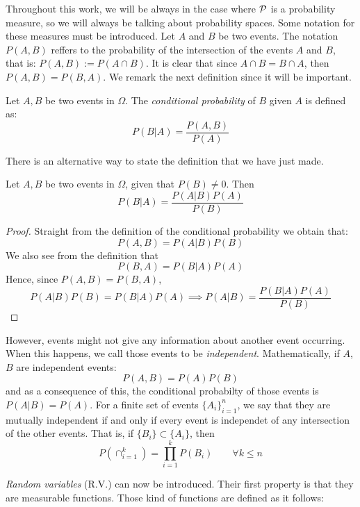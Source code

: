 Throughout this work, we will be always in the case where $\mathcal{P}$ is a probability measure, so we will always be talking about probability spaces. Some notation for these measures must be introduced. Let $A$ and $B$ be two events.
The notation $P(A,B)$ reffers to the probability of the intersection of the events $A$ and $B$, that is: $P(A,B) := P(A\cap B)$.
 It is clear that since $A \cap B = B \cap A$, then $P(A,B) = P(B,A)$. We remark the next definition since it will be important.

\begin{ndef}
Let $A,B$ be two events in $\Omega$. The \emph{conditional probability} of $B$ given $A$ is defined as:
$$
P(B|A) = \frac{P(A,B)}{P(A)}
$$
\end{ndef}




There is an alternative way to state the definition that we have just made.

\begin{nth}
Let $A,B$ be two events in $\Omega$, given that $P(B) \neq 0$. Then
$$
P(B|A) = \frac{P(A|B) P(A)}{P(B)}
$$
\end{nth}
\begin{proof}
Straight from the definition of the conditional probability we obtain that:
$$
P(A,B) = P(A|B)P(B)
$$
We also see from the definition that
$$
P(B,A) = P(B|A)P(A)
$$
Hence, since $P(A,B) = P(B,A)$,
$$
P(A|B)P(B) = P(B|A)P(A) \implies P(A|B) = \frac{P(B|A)P(A)}{P(B)}
$$
\end{proof}


However, events might not give any information about another event occurring. When this happens, we call those events to be \emph{independent}. Mathematically, if $A$,$B$ are independent events:
$$
P(A,B) = P(A)P(B)
$$
and as a consequence of this, the conditional probabilty of those events is $P(A|B) = P(A)$. For a finite set of events $\{A_i\}_{i=1}^n$, we say that they are mutually independent if and only if every event is independet of any intersection of the other events. 
That is, if $\{B_i\} \subset \{A_i\}$, then
$$
P\left(\cap_{i = 1}^k\right) = \prod_{i = 1}^k P(B_i) \quad \quad \forall k \leq n
$$

\emph{Random variables} (R.V.) can now be introduced. Their first property is that they are measurable functions. Those kind of functions are defined as it follows:


